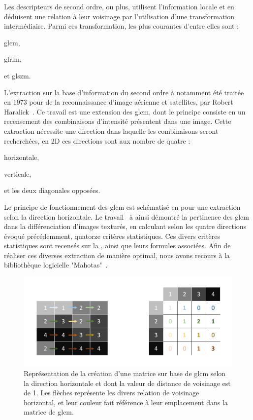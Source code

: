 Les descripteurs de second ordre, ou plus, utilisent l'information locale et en déduisent une relation à leur voisinage par l'utilisation d'une transformation intermédiaire. Parmi ces transformation, les plus courantes d'entre elles sont : 
\begin{inlinerate}
    \item \gls{glcm},
    \item \gls{glrlm},
    \item et \gls{glszm}.
\end{inlinerate} 
L'extraction sur la base d'information du second ordre à notamment été traitée en 1973 pour de la reconnaissance d'image aérienne et satellites, par Robert Haralick~\cite{Haralick1973}. Ce travail est une extension des \gls{glcm}, dont le principe consiste en un recensement des combinaisons d'intensité présentent dans une image. Cette extraction nécessite une direction dans laquelle les combinaisons seront recherchées, en 2D ces directions sont aux nombre de quatre :
\begin{inlinerate}
    \item horizontale,
    \item verticale,
    \item et les deux diagonales opposées.
\end{inlinerate}
Le principe de fonctionnement des \gls{glcm} est schématisé en  pour une extraction selon la direction horizontale. Le travail~\cite{Haralick1973} à ainsi démontré la pertinence des \gls{glcm} dans la différenciation d'images texturés, en calculant selon les quatre directions évoqué précédemment, quatorze critères statistiques. Ces divers critères statistiques sont recensés sur la , ainsi que leurs formules associées. Afin de réaliser ces diverses extraction de manière optimal, nous avons recours à la bibliothèque logicielle "Mahotas"~\cite{coelho2012}.\par
 
\begin{figure}[H]
    \centering
    \includegraphics[width=\linewidth]{contents/chapter_4/resources/scheme_principle_GLCM.pdf}
    \caption{Représentation de la création d'une matrice sur base de \gls{glcm} selon la direction horizontale et dont la valeur de distance de voisinage est de 1. Les flèches représente les divers relation de voisinage horizontal, et leur couleur fait référence à leur emplacement dans la matrice de \gls{glcm}.}
    \label{fig:scheme_principle_GLCM}
\end{figure}\par

